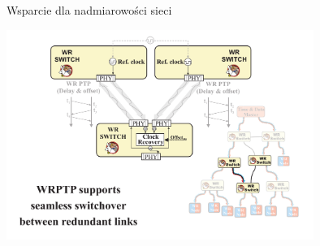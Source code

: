 \documentclass[compress,red]{beamer}
\begin{document}
% 
% 
\begin{frame}{Wsparcie dla nadmiarowości sieci}


  \begin{center}
  \includegraphics[width=10cm]{robustness/wrCRS2.pdf}
  \end{center}

\end{frame}
\end{document}
